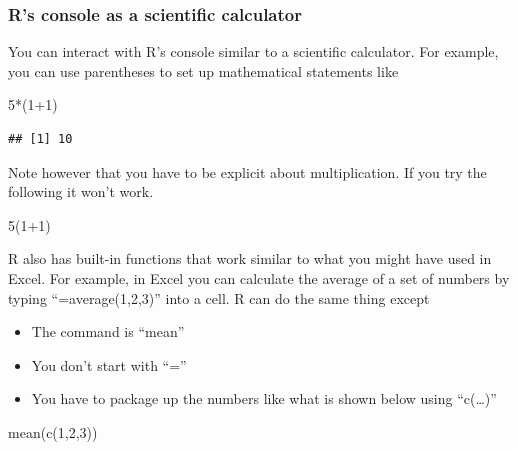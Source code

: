 \documentclass[
]{book}
\newenvironment{Shaded}{\begin{snugshade}}{\end{snugshade}}
\newcommand{\DecValTok}[1]{\textcolor[rgb]{0.00,0.00,0.81}{#1}}
\newcommand{\FunctionTok}[1]{\textcolor[rgb]{0.00,0.00,0.00}{#1}}
\newcommand{\NormalTok}[1]{#1}
\newcommand{\SpecialCharTok}[1]{\textcolor[rgb]{0.00,0.00,0.00}{#1}}
\providecommand{\tightlist}{%
  \setlength{\itemsep}{0pt}\setlength{\parskip}{0pt}}
\begin{document}
\hypertarget{rs-console-as-a-scientific-calculator}{%
\subsubsection{R's console as a scientific calculator}\label{rs-console-as-a-scientific-calculator}}

You can interact with R's console similar to a scientific calculator. For example, you can use parentheses to set up mathematical statements like

\begin{Shaded}
\begin{Highlighting}[]
\DecValTok{5}\SpecialCharTok{*}\NormalTok{(}\DecValTok{1}\SpecialCharTok{+}\DecValTok{1}\NormalTok{)}
\end{Highlighting}
\end{Shaded}

\begin{verbatim}
## [1] 10
\end{verbatim}

Note however that you have to be explicit about multiplication. If you try the following it won't work.

\begin{Shaded}
\begin{Highlighting}[]
\DecValTok{5}\NormalTok{(}\DecValTok{1}\SpecialCharTok{+}\DecValTok{1}\NormalTok{)}
\end{Highlighting}
\end{Shaded}

R also has built-in functions that work similar to what you might have used in Excel. For example, in Excel you can calculate the average of a set of numbers by typing ``=average(1,2,3)'' into a cell. R can do the same thing except

\begin{itemize}
\tightlist
\item
  The command is ``mean''
\item
  You don't start with ``=''
\item
  You have to package up the numbers like what is shown below using ``c(\ldots)''
\end{itemize}

\begin{Shaded}
\begin{Highlighting}[]
\FunctionTok{mean}\NormalTok{(}\FunctionTok{c}\NormalTok{(}\DecValTok{1}\NormalTok{,}\DecValTok{2}\NormalTok{,}\DecValTok{3}\NormalTok{))}
\end{Highlighting}
\end{Shaded}
\end{document}
